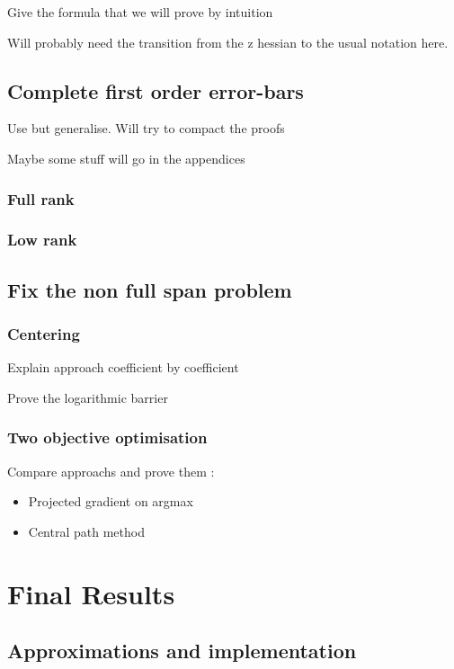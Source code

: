 \documentclass[10pt]{report}
\theoremstyle{plain}
\theoremstyle{definition}
\theoremstyle{remark}
\begin{document}
Give the formula that we will prove by intuition

Will probably need the transition from the z hessian to the usual notation here.

\section{Complete first order error-bars}

Use \cite{SPRAL17} but generalise. Will try to compact the proofs

Maybe some stuff will go in the appendices
\subsection{Full rank}

\subsection{Low rank}

\section{Fix the non full span problem}\label{sec:fixspan}

\subsection{Centering}

Explain approach coefficient by coefficient

Prove the logarithmic barrier

\subsection{Two objective optimisation}

Compare approachs and prove them :
\begin{itemize}
  \item Projected gradient on argmax
  \item Central path method
\end{itemize}

\chapter{Final Results}

\section{Approximations and implementation}
\end{document}
